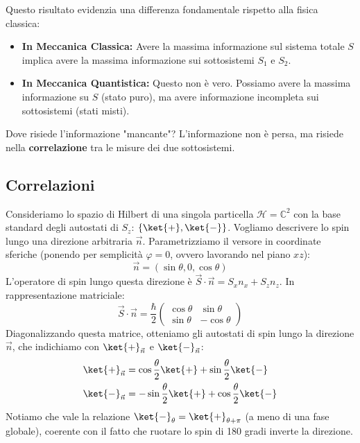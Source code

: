 Questo risultato evidenzia una differenza fondamentale rispetto alla fisica classica:
\begin{itemize}
    \item \textbf{In Meccanica Classica:} Avere la massima informazione sul sistema totale \(S\) implica avere la massima informazione sui sottosistemi \(S_1\) e \(S_2\).
    \item \textbf{In Meccanica Quantistica:} Questo non è vero. Possiamo avere la massima informazione su \(S\) (stato puro), ma avere informazione incompleta sui sottosistemi (stati misti).
\end{itemize}

Dove risiede l'informazione "mancante"?
L'informazione non è persa, ma risiede nella \textbf{correlazione} tra le misure dei due sottosistemi.

\subsection{Correlazioni}

Consideriamo lo spazio di Hilbert di una singola particella \(\mathcal{H} = \mathbb{C}^2\) con la base standard degli autostati di \(S_z\): \(\{\ket{+}, \ket{-}\}\).
Vogliamo descrivere lo spin lungo una direzione arbitraria \(\vec{n}\). Parametrizziamo il versore in coordinate sferiche (ponendo per semplicità \(\varphi=0\), ovvero lavorando nel piano \(xz\)):
\[
    \vec{n} = (\sin\theta, 0, \cos\theta)
\]
L'operatore di spin lungo questa direzione è \(\vec{S} \cdot \vec{n} = S_x n_x + S_z n_z\). In rappresentazione matriciale:
\[
    \vec{S} \cdot \vec{n} = \frac{\hbar}{2} 
    \begin{pmatrix}
        \cos\theta & \sin\theta \\
        \sin\theta & -\cos\theta
    \end{pmatrix}
\]
Diagonalizzando questa matrice, otteniamo gli autostati di spin lungo la direzione \(\vec{n}\), che indichiamo con \(\ket{+}_{\vec{n}}\) e \(\ket{-}_{\vec{n}}\):
\begin{align}
    \ket{+}_{\vec{n}} &= \cos\frac{\theta}{2}\ket{+} + \sin\frac{\theta}{2}\ket{-} \\
    \ket{-}_{\vec{n}} &= -\sin\frac{\theta}{2}\ket{+} + \cos\frac{\theta}{2}\ket{-}
\end{align}
Notiamo che vale la relazione \(\ket{-}_{\theta} = \ket{+}_{\theta + \pi}\) (a meno di una fase globale), coerente con il fatto che ruotare lo spin di 180 gradi inverte la direzione.


